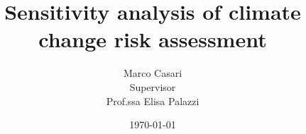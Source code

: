 \title{Sensitivity analysis of climate change risk assessment}
\author{%
  Marco Casari\\[2ex]%
  {\scriptsize Supervisor}\\%
  Prof.ssa Elisa Palazzi\\%
}
\date{\today}  %
\maketitle
